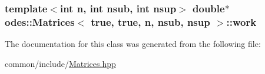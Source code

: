 \hypertarget{classodes_1_1Matrices_3_01true_00_01true_00_01n_00_01nsub_00_01nsup_01_4_a11aeb74270d9f8b97c708ef9bf226902}{
\subsubsection[{work}]{\setlength{\rightskip}{0pt plus 5cm}template$<$int n, int nsub, int nsup$>$ double$\ast$ {\bf odes\-::\-Matrices}$<$ true, true, n, nsub, nsup $>$\-::work\hspace{0.3cm}{\ttfamily [private]}}}\label{classodes_1_1Matrices_3_01true_00_01true_00_01n_00_01nsub_00_01nsup_01_4_a11aeb74270d9f8b97c708ef9bf226902}


The documentation for this class was generated from the following file\-:\begin{DoxyCompactItemize}
\item 
common/include/\hyperlink{Matrices_8hpp}{Matrices.\-hpp}\end{DoxyCompactItemize}
